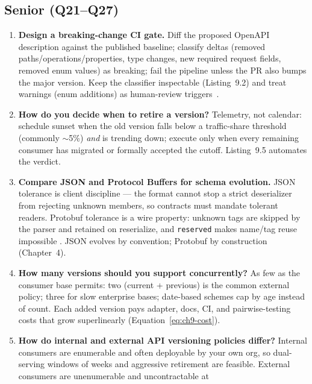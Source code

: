 \subsection*{Senior (Q21--Q27)}
\begin{enumerate}[label=\textbf{Q\arabic*.}, leftmargin=1.6cm, start=21]
  \item \textbf{Design a breaking-change CI gate.}
        Diff the proposed OpenAPI description against the published baseline;
        classify deltas (removed paths/operations/properties, type changes,
        new required request fields, removed enum values) as breaking; fail
        the pipeline unless the PR also bumps the major version. Keep the
        classifier inspectable (Listing~9.2) and treat warnings (enum
        additions) as human-review triggers~\cite{openapi31}.
  \item \textbf{How do you decide when to retire a version?}
        Telemetry, not calendar: schedule sunset when the old version falls
        below a traffic-share threshold (commonly $\sim$5\%) \emph{and} is
        trending down; execute only when every remaining consumer has
        migrated or formally accepted the cutoff. Listing~9.5 automates the
        verdict.
  \item \textbf{Compare JSON and Protocol Buffers for schema evolution.}
        JSON tolerance is client discipline --- the format cannot stop a
        strict deserializer from rejecting unknown members, so contracts must
        mandate tolerant readers. Protobuf tolerance is a wire property:
        unknown tags are skipped by the parser and retained on reserialize,
        and \texttt{reserved} makes name/tag reuse impossible
        \cite{protobufdocs}. JSON evolves by convention; Protobuf by
        construction (Chapter~4).
  \item \textbf{How many versions should you support concurrently?}
        As few as the consumer base permits: two (current + previous) is the
        common external policy; three for slow enterprise bases; date-based
        schemes cap by age instead of count. Each added version pays adapter,
        docs, CI, and pairwise-testing costs that grow superlinearly
        (Equation~\ref{eq:ch9-cost}).
  \item \textbf{How do internal and external API versioning policies differ?}
        Internal consumers are enumerable and often deployable by your own
        org, so dual-serving windows of weeks and aggressive retirement are
        feasible. External consumers are unenumerable and uncontractable at

\end{enumerate}

